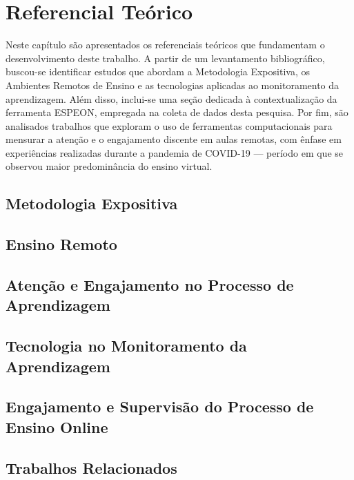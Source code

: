 \chapter{Referencial Teórico}\label{chp:theory}
Neste capítulo são apresentados os referenciais teóricos que fundamentam o desenvolvimento deste trabalho. A partir de um levantamento bibliográfico, buscou-se identificar estudos que abordam a Metodologia Expositiva, os Ambientes Remotos de Ensino e as tecnologias aplicadas ao monitoramento da aprendizagem. Além disso, inclui-se uma seção dedicada à contextualização da ferramenta ESPEON, empregada na coleta de dados desta pesquisa. Por fim, são analisados trabalhos que exploram o uso de ferramentas computacionais para mensurar a atenção e o engajamento discente em aulas remotas, com ênfase em experiências realizadas durante a pandemia de COVID-19 — período em que se observou maior predominância do ensino virtual.

\section{Metodologia Expositiva}\label{sec:expositive_methodology}


\section{Ensino Remoto}\label{sec:remote_learning}


\section{Atenção e Engajamento no Processo de Aprendizagem}\label{sec:attention_engajement}


\section{Tecnologia no Monitoramento da Aprendizagem}\label{sec:tecnology_on_learn_monitoring}


\section{Engajamento e Supervisão do Processo de Ensino Online}\label{sec:espeon_context}


\section{Trabalhos Relacionados}\label{sec:related}


